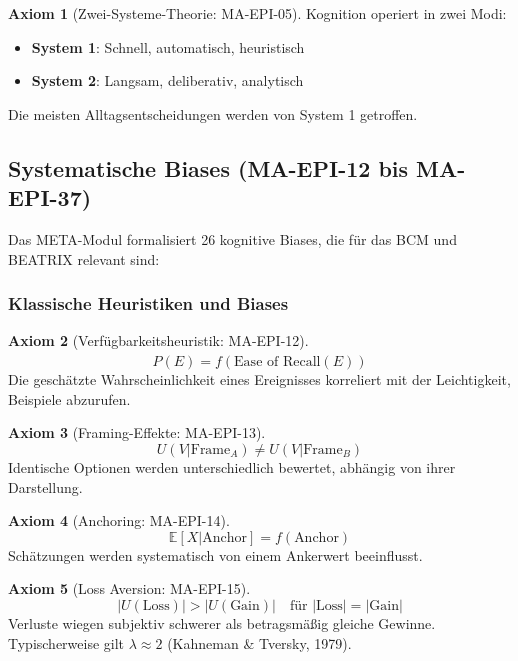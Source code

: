 \documentclass[11pt,a4paper]{article}
\theoremstyle{definition}
\newtheorem{axiom}{Axiom}[section]
\theoremstyle{plain}
\newcommand{\BCM}{\textsc{BCM}}
\newcommand{\META}{\textsc{META}}
\newcommand{\BEATRIX}{\textsc{BEATRIX}}
\begin{document}
\begin{axiom}[Zwei-Systeme-Theorie: MA-EPI-05]
Kognition operiert in zwei Modi:
\begin{itemize}
    \item \textbf{System 1}: Schnell, automatisch, heuristisch
    \item \textbf{System 2}: Langsam, deliberativ, analytisch
\end{itemize}
Die meisten Alltagsentscheidungen werden von System 1 getroffen.
\end{axiom}

\subsection{Systematische Biases (MA-EPI-12 bis MA-EPI-37)}

Das \META-Modul formalisiert 26 kognitive Biases, die für das \BCM{} und \BEATRIX{} relevant sind:

\subsubsection{Klassische Heuristiken und Biases}

\begin{axiom}[Verfügbarkeitsheuristik: MA-EPI-12]
\begin{equation}
\hat{P}(E) = f(\text{Ease of Recall}(E))
\end{equation}
Die geschätzte Wahrscheinlichkeit eines Ereignisses korreliert mit der Leichtigkeit, Beispiele abzurufen.
\end{axiom}

\begin{axiom}[Framing-Effekte: MA-EPI-13]
\begin{equation}
U(V|\text{Frame}_A) \neq U(V|\text{Frame}_B)
\end{equation}
Identische Optionen werden unterschiedlich bewertet, abhängig von ihrer Darstellung.
\end{axiom}

\begin{axiom}[Anchoring: MA-EPI-14]
\begin{equation}
\mathbb{E}[X|\text{Anchor}] = f(\text{Anchor})
\end{equation}
Schätzungen werden systematisch von einem Ankerwert beeinflusst.
\end{axiom}

\begin{axiom}[Loss Aversion: MA-EPI-15]
\begin{equation}
|U(\text{Loss})| > |U(\text{Gain})| \quad \text{für } |\text{Loss}| = |\text{Gain}|
\end{equation}
Verluste wiegen subjektiv schwerer als betragsmäßig gleiche Gewinne. Typischerweise gilt $\lambda \approx 2$ (Kahneman \& Tversky, 1979).
\end{axiom}
\end{document}
